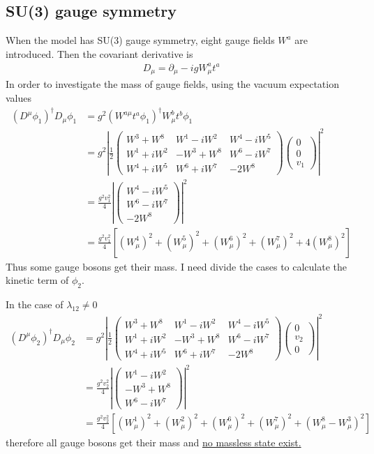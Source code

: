 \subsection{SU(3) gauge symmetry}
When the model has SU(3) gauge symmetry, eight gauge fields $W^a$ are introduced. Then the covariant derivative is
\begin{align*}
    D_{\mu}=\partial_{\mu}-igW^a_{\mu}t^a
\end{align*}
In order to investigate the mass of gauge fields, using the vacuum expectation values
\begin{align*}
    (D^{\mu}\phi_1)^{\dag}D_{\mu}\phi_1&=g^2(W^{a\mu}t^a\phi_1)^{\dag}W^b_{\mu}t^b\phi_1\\
    &=g^2\left|\frac{1}{2}\begin{pmatrix}
        W^3+W^8&W^1-iW^2&W^4-iW^5\\
        W^1+iW^2&-W^3+W^8&W^6-iW^7\\
        W^4+iW^5&W^6+iW^7&-2W^8
    \end{pmatrix}\begin{pmatrix}
        0\\0\\v_1
    \end{pmatrix}\right|^2\\
    &=\frac{g^2v_1^2}{4}\left|\begin{pmatrix}
        W^4-iW^5\\W^6-iW^7\\-2W^8
    \end{pmatrix}\right|^2\\
    &=\frac{g^2v_1^2}{4}\left[(W^4_{\mu})^2+(W^5_{\mu})^2+(W^6_{\mu})^2+(W^7_{\mu})^2+4(W^8_{\mu})^2\right]
\end{align*}
Thus some gauge bosons get their mass. I need divide the cases to calculate the kinetic term of $\phi_2$.

In the case of $\lambda_{12}\neq0$
\begin{align*}
    (D^{\mu}\phi_2)^{\dag}D_{\mu}\phi_2&=g^2\left|\frac{1}{2}\begin{pmatrix}
        W^3+W^8&W^1-iW^2&W^4-iW^5\\
        W^1+iW^2&-W^3+W^8&W^6-iW^7\\
        W^4+iW^5&W^6+iW^7&-2W^8
    \end{pmatrix}\begin{pmatrix}
        0\\v_2\\0
    \end{pmatrix}\right|^2\\
    &=\frac{g^2v_2^2}{4}\left|\begin{pmatrix}
        W^1-iW^2\\
        -W^3+W^8\\
        W^6-iW^7
    \end{pmatrix}\right|^2\\
    &=\frac{g^2v_2^2}{4}\left[(W^1_{\mu})^2+(W^2_{\mu})^2+(W^6_{\mu})^2+(W^7_{\mu})^2+(W_{\mu}^8-W_{\mu}^3)^2\right]
\end{align*}
therefore all gauge bosons get their mass and \underline{no massless state exist.}


